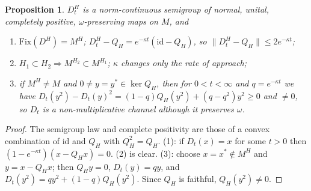 \documentclass[12pt]{article}
\newtheorem{proposition}[theorem]{Proposition}
\theoremstyle{definition}
\theoremstyle{remark}
\begin{document}
\begin{proposition}\label{prop:haar}
\(D^H_t\) is a norm-continuous semigroup of normal, unital, completely positive,
\(\omega\)-preserving maps on \(M\), and
\begin{enumerate}[label=(\arabic*),leftmargin=2em,itemsep=1pt]
\item \(\mathrm{Fix}(D^H)=M^H\); \(D_t^H-Q_H=e^{-\kappa t}(\mathrm{id}-Q_H)\), so
\(\|D_t^H-Q_H\|\le2e^{-\kappa t}\);
\item \(H_1\subset H_2\Rightarrow M^{H_2}\subset M^{H_1}\); \(\kappa\) changes only the
rate of approach;
\item if \(M^H\ne M\) and \(0\ne y=y^*\in\ker Q_H\), then for \(0<t<\infty\) and \(q=e^{-\kappa t}\) we have \(D_t(y^2)-D_t(y)^2=(1-q)Q_H(y^2)+(q-q^2)y^2\ge0\) and \(\ne0\), so \(D_t\) is a
non-multiplicative channel although it preserves \(\omega\).
\end{enumerate}
\end{proposition}
\begin{proof}
The semigroup law and complete positivity are those of a convex combination of
\(\mathrm{id}\) and \(Q_H\) with \(Q_H^2=Q_H\). (1): if \(D_t(x)=x\) for some
\(t>0\) then \((1-e^{-\kappa t})(x-Q_Hx)=0\). (2) is clear. (3): choose \(x=x^*\notin M^H\)
and \(y=x-Q_Hx\); then \(Q_Hy=0\), \(D_t(y)=qy\), and
\(D_t(y^2)=qy^2+(1-q)Q_H(y^2)\). Since \(Q_H\) is faithful, \(Q_H(y^2)\ne0\).
\end{proof}
\end{document}
